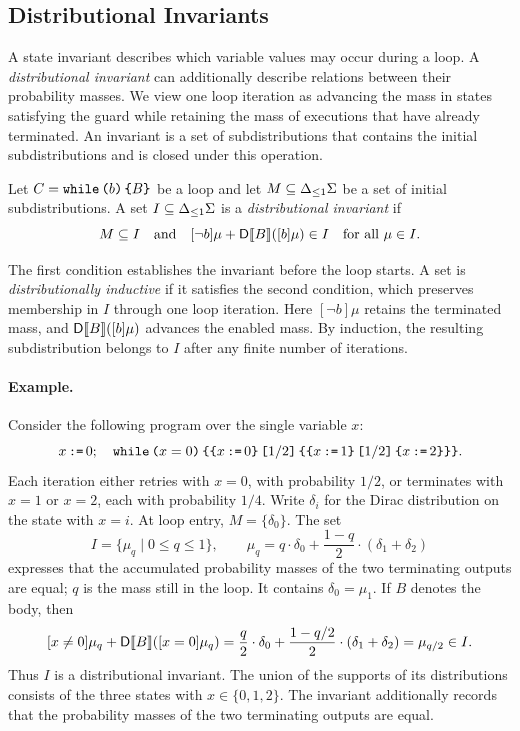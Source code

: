 \subsection{Distributional Invariants}

A state invariant describes which variable values may occur during a
loop. A \emph{distributional invariant} can additionally describe relations
between their probability masses. We view one loop iteration as advancing
the mass in states satisfying the guard while retaining the mass of
executions that have already terminated. An invariant is a set of
subdistributions that contains the initial subdistributions and is closed
under this operation.

\begin{definition}
\label{def:distributional-invariant}
Let $C=\textnormal{\texttt{while}}\,\textnormal{\texttt{(}} b\textnormal{\texttt{)}}\,\textnormal{\texttt{\{}} B\textnormal{\texttt{\}}}$ be a loop and let $M\subseteq{\Delta_{\leq 1}\Sigma}$ be a set
of initial subdistributions. A set $I\subseteq{\Delta_{\leq 1}\Sigma}$ is a
\emph{distributional invariant} if
\[
 M\subseteq I
 \quad\text{and}\quad
 [\neg b]\mu+\mathsf{D}\llbracket B\rrbracket([b]\mu)\in I\quad\text{for all }\mu\in I.
\]
\end{definition}
The first condition establishes the invariant before the loop starts.
A set is \emph{distributionally inductive} if it satisfies the second
condition, which preserves membership in $I$ through one loop iteration.
Here $[\neg b]\mu$
retains the terminated mass, and $\mathsf{D}\llbracket B\rrbracket([b]\mu)$ advances the enabled
mass. By induction, the resulting subdistribution belongs to $I$ after
any finite number of iterations.

\paragraph{Example.}
Consider the following program over the single variable $x$:
\[
 x\,\textnormal{\texttt{:=}}\,0;\quad
 \textnormal{\texttt{while}}\,\textnormal{\texttt{(}} x=0\textnormal{\texttt{)}}\,\textnormal{\texttt{\{}}\textnormal{\texttt{\{}}x\,\textnormal{\texttt{:=}}\,0\textnormal{\texttt{\}}} \, \textnormal{\texttt{[}}1/2\textnormal{\texttt{]}} \, \textnormal{\texttt{\{}}\textnormal{\texttt{\{}}x\,\textnormal{\texttt{:=}}\,1\textnormal{\texttt{\}}} \, \textnormal{\texttt{[}}1/2\textnormal{\texttt{]}} \, \textnormal{\texttt{\{}}x\,\textnormal{\texttt{:=}}\,2\textnormal{\texttt{\}}}\textnormal{\texttt{\}}}\textnormal{\texttt{\}}}.
\]
Each iteration either retries with $x=0$, with probability $1/2$, or
terminates with $x=1$ or $x=2$, each with probability $1/4$.
Write $\delta_i$ for the Dirac distribution on the state with $x=i$.
At loop entry, $M=\{\delta_0\}$. The set
\[
 I=\{\mu_q\mid 0\leq q\leq1\},
 \qquad
 \mu_q=q \cdot \delta_0+\frac{1-q}{2} \cdot (\delta_1+\delta_2)
\]
expresses that the accumulated probability masses of the two terminating
outputs are equal; $q$ is the mass still in the loop.
It contains $\delta_0=\mu_1$. If $B$ denotes the body, then
\[
 [x\neq0]\mu_q+\mathsf{D}\llbracket B\rrbracket([x=0]\mu_q)
 =\frac q2 \cdot \delta_0+\frac{1-q/2}{2} \cdot (\delta_1+\delta_2)
 =\mu_{q/2}\in I.
\]
Thus $I$ is a distributional invariant.
The union of the supports of its distributions consists of the
three states with $x\in\{0,1,2\}$.
The invariant additionally records that the probability masses
of the two terminating outputs are equal.

